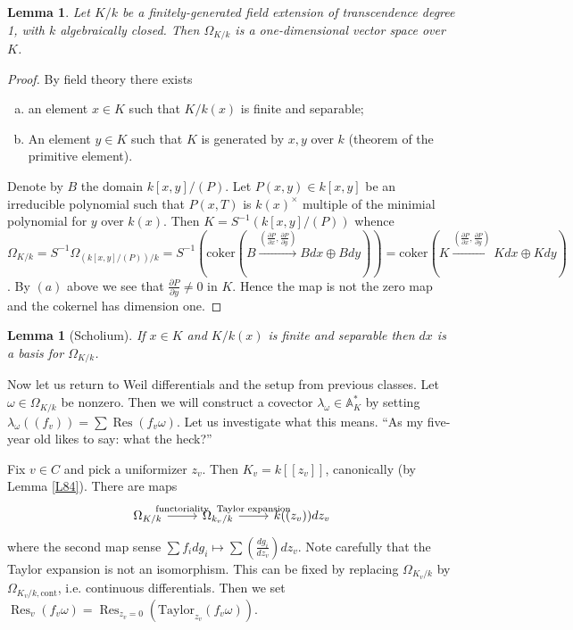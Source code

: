\documentclass{article}
\DeclareMathOperator{\res}{Res}
\theoremstyle{plain}
\newtheorem{lem}[thm]{Lemma}
\theoremstyle{definition}
\theoremstyle{remark}
\begin{document}
\begin{lem}
\label{L95}
Let $K/k$ be a finitely-generated field extension of transcendence degree 1, with $k$ algebraically closed. Then $\Omega_{K/k}$ is a one-dimensional vector space over $K$.
\end{lem}
\begin{proof}
By field theory there exists
\begin{enumerate}[(a)]
\item an element $x\in K$ such that $K/k(x)$ is finite and separable;
\item An element $y\in K$ such that $K$ is generated by $x,y$ over $k$ (theorem of the primitive element).
\end{enumerate}
Denote by $B$ the domain $k[x,y]/(P)$.
Let $P(x,y)\in k[x,y]$ be an irreducible polynomial such that $P(x,T)$ is $k(x)^\times$ multiple of the minimial polynomial for $y$ over $k(x)$. Then $K=S^{-1}(k[x,y]/(P))$ whence $\Omega_{K/k}=S^{-1}\Omega_{(k[x,y]/(P))/k}=S^{-1}\left(\text{coker}\left(B\overset{(\frac{\partial P}{\partial x},\frac{\partial P}{\partial y})}{\to}Bdx\oplus Bdy\right)\right)=\text{coker}\left(K\overset{(\frac{\partial P}{\partial x},\frac{\partial P}{\partial y})}{\to}Kdx\oplus Kdy\right)$. By $(a)$ above we see that $\frac{\partial P}{\partial y}\neq 0$ in $K$. Hence the map is not the zero map and the cokernel has dimension one.
\end{proof}

\begin{lem}[Scholium]
\label{L96}
If $x\in K$ and $K/k(x)$ is finite and separable then $dx$ is a basis for $\Omega_{K/k}$.
\end{lem}

Now let us return to Weil differentials and the setup from previous classes. Let $\omega\in\Omega_{K/k}$ be nonzero. Then we will construct a covector $\lambda_\omega\in\mathbb{A}_K^*$ by setting $\lambda_\omega((f_v))=\sum\res\left(f_v\omega\right)$. Let us investigate what this means. ``As my five-year old likes to say: what the heck?''

Fix $v\in C$ and pick a uniformizer $z_v$. Then $K_v=k[[z_v]]$, canonically (by Lemma \ref{L84}). There are maps
\begin{equation}
\begin{tikzcd}
\Omega_{K/k}\arrow{r}{\text{functoriality}}&\Omega_{k_v/k}\arrow{r}{\text{Taylor expansion}}&k((z_v))dz_v
\end{tikzcd}
\end{equation}
where the second map sense $\sum f_i dg_i\mapsto \sum\left(\frac{dg_i}{dz_v}\right)dz_v$.
Note carefully that the Taylor expansion is not an isomorphism. This can be fixed by replacing $\Omega_{K_v/k}$ by $\Omega_{K_v/k,\text{cont}}$, i.e. continuous differentials.
Then we set $\res_v(f_v\omega)=\res_{z_v=0}\left(\text{Taylor}_{z_v}(f_v\omega)\right)$.
\end{document}
